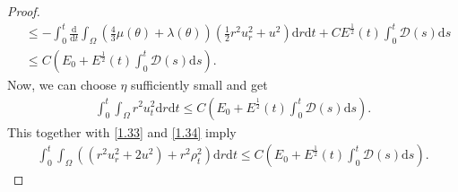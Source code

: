\documentclass[11pt,reqno]{amsart}
\numberwithin{equation}{section}
\newcommand{\dif}{\mathrm{d}}
\newcommand{\intx}{\int_0^t \int_{\Omega} }
\begin{document}
\begin{proof}
\begin{align*}
&\le -\int_0^t \frac{\dif}{\dif t} \int_{\Omega} \left(\frac{4}{3} \mu(\theta)+\lambda(\theta)\right)(\frac{1}{2}r^2 u_r^2+u^2) \dif r \dif t +CE^\frac{1}{2}(t) \int_0^t  \mathcal D(s)\dif s\\
&\le C(E_0+E^\frac{1}{2}(t) \int_0^t  \mathcal D(s)\dif s).
\end{align*}
Now, we can choose $\eta$ sufficiently small and get
\begin{align}\label{1.36}
\intx r^2 u_t^2 \dif r \dif t \le C(E_0+E^\frac{1}{2}(t) \int_0^t  \mathcal D(s)\dif s).
\end{align}
This together with \eqref{1.33} and \eqref{1.34} imply
\begin{align}\label{1.37}
\intx ((r^2 u_r^2+2u^2)+r^2 \rho_t^2 )\dif r \dif t \le C(E_0+E^\frac{1}{2}(t) \int_0^t  \mathcal D(s)\dif s).
\end{align}


\end{proof}
\end{document}
